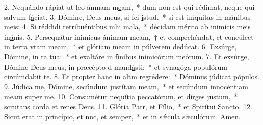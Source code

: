 2. Nequándo rápiat ut leo ánmam m\uline{e}am,~* dum non est qui rédimat, neque qui salvum f\uline{á}ciat.
3. Dómine, Deus meus, si fci \uline{i}stud.~* si est iníquitas in mánibus m\uline{e}is:
4. Si réddidi retribuéntibus mhi m\uline{a}la,~* décidam mérito ab inimícis meis in\uline{á}nis.
5. Persequátur inimícus ánimam meam,~† et comprehéndat, et concúlcet in terra vtam m\uline{e}am,~* et glóriam meam in púlverem ded\uline{ú}cat.
6. Exsúrge, Dómine, in ra t\uline{u}a:~* et exaltáre in fínibus inimicórum me\uline{ó}rum.
7. Et exsúrge, Dómine Deus meus, in præcépto d mand\uline{á}sti:~* et synagóga populórum circúmdab\uline{i}t te.
8. Et propter hanc in altm regr\uline{é}dere:~* Dóminus júdicat p\uline{ó}pulos.
9. Júdica me, Dómine, secúndum justítam m\uline{e}am,~* et secúndum innocéntiam meam s\uline{u}per me.
10. Consumétur nequítia peccatórum, et dírges j\uline{u}stum,~* scrutans corda et renes D\uline{e}us.
11. Glória Patr, et F\uline{í}lio,~* et Spirítui S\uline{a}ncto.
12. Sicut erat in princípio, et nnc, et s\uline{e}mper,~* et in sǽcula sæculórum. \uline{A}men.
